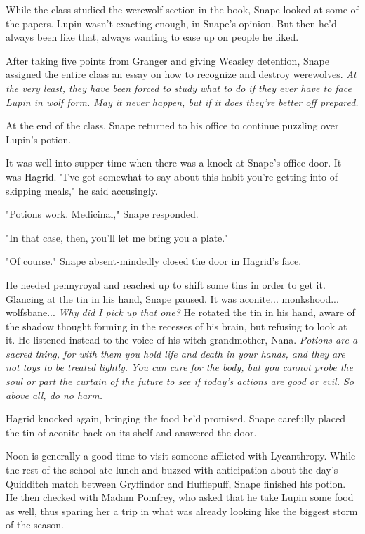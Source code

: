 \documentclass[a4paper,11pt]{article}
\begin{document}
While the class studied the werewolf section in the book, Snape looked at some of the papers. Lupin wasn't exacting enough, in Snape's opinion. But then he'd always been like that, always wanting to ease up on people he liked.

After taking five points from Granger and giving Weasley detention, Snape assigned the entire class an essay on how to recognize and destroy werewolves. \emph{At the very least, they have been forced to study what to do if they ever have to face Lupin in wolf form. May it never happen, but if it does they're better off prepared.}

At the end of the class, Snape returned to his office to continue puzzling over Lupin's potion.

It was well into supper time when there was a knock at Snape's office door. It was Hagrid. "I've got somewhat to say about this habit you're getting into of skipping meals," he said accusingly.

"Potions work. Medicinal," Snape responded.

"In that case, then, you'll let me bring you a plate."

"Of course." Snape absent-mindedly closed the door in Hagrid's face.

He needed pennyroyal and reached up to shift some tins in order to get it. Glancing at the tin in his hand, Snape paused. It was aconite... monkshood... wolfsbane... \emph{Why did I pick up that one?} He rotated the tin in his hand, aware of the shadow thought forming in the recesses of his brain, but refusing to look at it. He listened instead to the voice of his witch grandmother, Nana. \emph{Potions are a sacred thing, for with them you hold life and death in your hands, and they are not toys to be treated lightly. You can care for the body, but you cannot probe the soul or part the curtain of the future to see if today's actions are good or evil. So above all, do no harm.}

Hagrid knocked again, bringing the food he'd promised. Snape carefully placed the tin of aconite back on its shelf and answered the door.

Noon is generally a good time to visit someone afflicted with Lycanthropy. While the rest of the school ate lunch and buzzed with anticipation about the day's Quidditch match between Gryffindor and Hufflepuff, Snape finished his potion. He then checked with Madam Pomfrey, who asked that he take Lupin some food as well, thus sparing her a trip in what was already looking like the biggest storm of the season.
\end{document}
